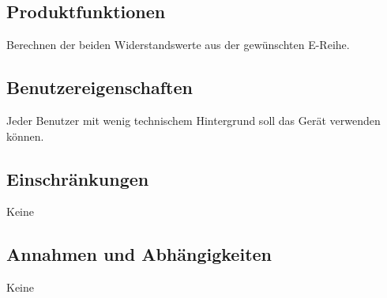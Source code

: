 \subsection{Produktfunktionen}
Berechnen der beiden Widerstandswerte aus der gewünschten E-Reihe.

\subsection{Benutzereigenschaften}
Jeder Benutzer mit wenig technischem Hintergrund soll das Gerät verwenden können.

\subsection{Einschränkungen}
Keine


\subsection{Annahmen und Abhängigkeiten}
Keine

